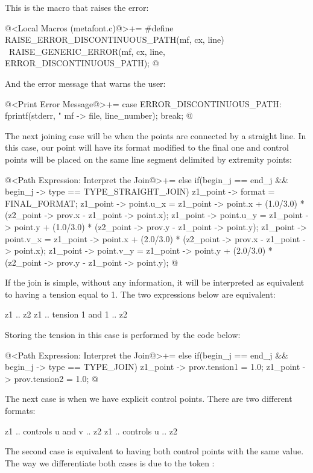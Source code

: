 {{{{{This is the macro that raises the error:

\iniciocodigo
@<Local Macros (metafont.c)@>+=
#define RAISE_ERROR_DISCONTINUOUS_PATH(mf, cx, line) {\
  RAISE_GENERIC_ERROR(mf, cx, line, ERROR_DISCONTINUOUS_PATH);}
@
\fimcodigo

And the error message that warns the user:

\iniciocodigo
@<Print Error Message@>+=
case ERROR_DISCONTINUOUS_PATH:
  fprintf(stderr,
          "%
          mf -> file, line_number);
  break;
@
\fimcodigo

The next joining case will be when the points are connected by a
straight line. In this case, our point will have its format modified
to the final one and control points will be placed on the same line
segment delimited by extremity points:

\iniciocodigo
@<Path Expression: Interpret the Join@>+=
else if(begin_j == end_j && begin_j -> type == TYPE_STRAIGHT_JOIN){
  z1_point -> format = FINAL_FORMAT;
  z1_point -> point.u_x = z1_point -> point.x + (1.0/3.0) *
                         (z2_point -> prov.x - z1_point -> point.x);
  z1_point -> point.u_y = z1_point -> point.y + (1.0/3.0) *
                         (z2_point -> prov.y - z1_point -> point.y);
  z1_point -> point.v_x = z1_point -> point.x + (2.0/3.0) *
                         (z2_point -> prov.x - z1_point -> point.x);
  z1_point -> point.v_y = z1_point -> point.y + (2.0/3.0) *
                         (z2_point -> prov.y - z1_point -> point.y);
}
@
\fimcodigo

If the join is simple, without any information, it will be interpreted
as equivalent to having a tension equal to 1. The two expressions
below are equivalent:

\alinhaverbatim
z1 .. z2
z1 .. tension 1 and 1 .. z2
\alinhanormal

Storing the tension in this case is performed by the code below:

\iniciocodigo
@<Path Expression: Interpret the Join@>+=
else if(begin_j == end_j && begin_j -> type == TYPE_JOIN){
  z1_point -> prov.tension1 = 1.0;
  z1_point -> prov.tension2 = 1.0;
}
@
\fimcodigo

The next case is when we have explicit control points. There are two
different formats:

\alinhaverbatim
z1 .. controls u and v .. z2
z1 .. controls u .. z2
\alinhanormal

The second case is equivalent to having both control points with the
same value. The way we differentiate both cases is due to the
token :

}}}}}
